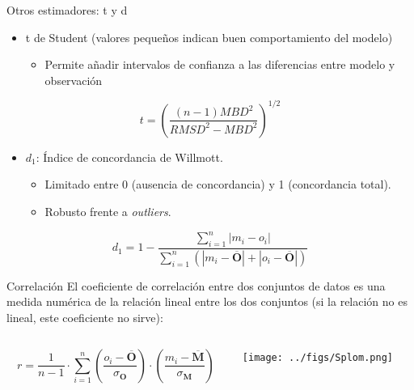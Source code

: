 \documentclass[aspectratio=169, usenames,svgnames,dvipsnames]{beamer}
\begin{document}
\begin{frame}[label={sec:orgb46e4ac}]{Otros estimadores: t y d}
\begin{itemize}
\item t de Student (valores pequeños indican buen comportamiento del modelo)
\begin{itemize}
\item Permite añadir intervalos de confianza a las diferencias entre
modelo y observación
\end{itemize}
\end{itemize}

\[
t = \left ( \frac{(n-1) MBD^2}{RMSD^2 - MBD^2} \right)^{1/2}
\]

\nocite{Stone1993}


\begin{itemize}
\item \(d_1\): Índice de concordancia de Willmott.
\begin{itemize}
\item Limitado entre 0 (ausencia de concordancia) y 1 (concordancia total).
\item Robusto frente a \emph{outliers}.
\end{itemize}
\end{itemize}
\[
d_1 = 1 - \frac{\sum_{i=1}^n \left| m_i - o_i \right|}{\sum_{i=1}^n \left(
  \left| m_i - \overline{\mathbf{O}}\right| + \left| o_i -
    \overline{\mathbf{O}} \right| \right)}
\]

\nocite{Willmott.Robeson.ea2012}
\end{frame}

\begin{frame}[label={sec:org5955178}]{Correlación}
El coeficiente de correlación entre dos conjuntos de datos es una
medida numérica de la relación \alert{lineal} entre los dos conjuntos (si la
relación no es lineal, este coeficiente no sirve):

\begin{columns}
\begin{column}{0.5\columnwidth}
\[
r = \frac{1}{n-1} \cdot \sum_{i=1}^{n} \left( \frac{o_{i}-\overline{\mathbf{O}}}{\sigma_{\mathbf{O}}}\right) \cdot \left(\frac{m_{i}-\overline{\mathbf{M}}}{\sigma_{\mathbf{M}}}\right)
\]
\end{column}

\begin{column}{0.5\columnwidth}
\begin{center}
\texttt{[image: ../figs/Splom.png]}
\end{center}
\end{column}
\end{columns}
\end{frame}
\end{document}
